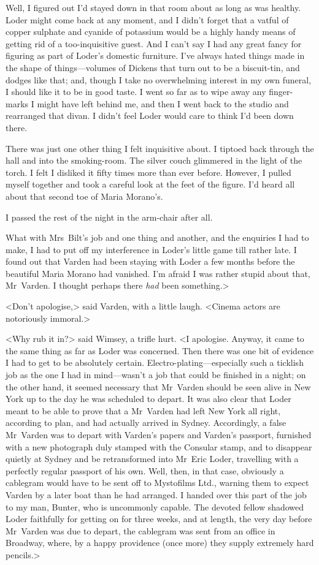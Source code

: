 Well, I figured out I'd stayed down in that room about as long as was healthy. Loder might come back at any moment, and I didn't forget that a vatful of copper sulphate and cyanide of potassium would be a highly handy means of getting rid of a too-inquisitive guest. And I can't say I had any great fancy for figuring as part of Loder's domestic furniture. I've always hated things made in the shape of things—volumes of Dickens that turn out to be a biscuit-tin, and dodges like that; and, though I take no overwhelming interest in my own funeral, I should like it to be in good taste. I went so far as to wipe away any finger-marks I might have left behind me, and then I went back to the studio and rearranged that divan. I didn't feel Loder would care to think I'd been down there.

There was just one other thing I felt inquisitive about. I tiptoed back through the hall and into the smoking-room. The silver couch glimmered in the light of the torch. I felt I disliked it fifty times more than ever before. However, I pulled myself together and took a careful look at the feet of the figure. I'd heard all about that second toe of Maria Morano's.

I passed the rest of the night in the arm-chair after all.

What with Mrs~Bilt's job and one thing and another, and the enquiries I had to make, I had to put off my interference in Loder's little game till rather late. I found out that Varden had been staying with Loder a few months before the beautiful Maria Morano had vanished. I'm afraid I was rather stupid about that, Mr~Varden. I thought perhaps there \textit{had} been something.>

<Don't apologise,> said Varden, with a little laugh. <Cinema actors are notoriously immoral.>

<Why rub it in?> said Wimsey, a trifle hurt. <I apologise. Anyway, it came to the same thing as far as Loder was concerned. Then there was one bit of evidence I had to get to be absolutely certain. Electro-plating—especially such a ticklish job as the one I had in mind—wasn't a job that could be finished in a night; on the other hand, it seemed necessary that Mr~Varden should be seen alive in New York up to the day he was scheduled to depart. It was also clear that Loder meant to be able to prove that a Mr~Varden had left New York all right, according to plan, and had actually arrived in Sydney. Accordingly, a false Mr~Varden was to depart with Varden's papers and Varden's passport, furnished with a new photograph duly stamped with the Consular stamp, and to disappear quietly at Sydney and be retransformed into Mr~Eric Loder, travelling with a perfectly regular passport of his own. Well, then, in that case, obviously a cablegram would have to be sent off to Mystofilms Ltd., warning them to expect Varden by a later boat than he had arranged. I handed over this part of the job to my man, Bunter, who is uncommonly capable. The devoted fellow shadowed Loder faithfully for getting on for three weeks, and at length, the very day before Mr~Varden was due to depart, the cablegram was sent from an office in Broadway, where, by a happy providence (once more) they supply extremely hard pencils.>

